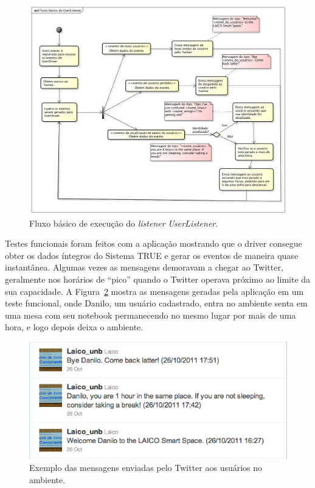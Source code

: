 	\begin{figure}[hbt]
		\begin{center}
			\includegraphics[scale=0.45]{figuras/5.Testes/diagrama-user-tweet.png}
		\end{center}
		\caption{Fluxo básico de execução do \textit{listener} \textit{UserListener}.}
		\label{fig:diagrama-tweet}
	\end{figure}

	Testes funcionais foram feitos com a aplicação mostrando que o driver consegue
	obter os dados íntegros do Sistema TRUE e gerar os eventos de maneira quase
	instantânea. Algumas vezes as mensagens demoravam a chegar ao Twitter,
	geralmente nos horários de ``pico'' quando o Twitter operava próximo ao limite
	da sua capacidade. A Figura~\ref{fig:tweets} mostra as mensagens geradas
	pela aplicação em um teste funcional, onde Danilo, um usuário cadastrado,
	entra no ambiente senta em uma mesa com seu notebook permanecendo no mesmo
	lugar por mais de uma hora, e logo depois deixa o ambiente.

	\begin{figure}[hbt]
			\begin{center}
				\includegraphics[scale=0.6]{figuras/5.Testes/tweets.png}
			\end{center}
			\caption{Exemplo das mensagens enviadas pelo Twitter aos usuários no ambiente.}
			\label{fig:tweets}
		\end{figure}	